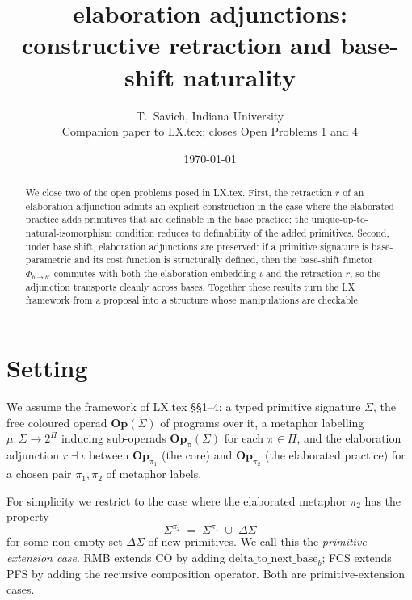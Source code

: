 \documentclass[11pt]{article}
\title{elaboration adjunctions: constructive retraction and base-shift naturality}
\author{T.\ Savich, Indiana University\\
\small Companion paper to LX.tex; closes Open Problems 1 and 4}
\date{\today}
\begin{document}
\maketitle

\noindent{}
\bigskip

\begin{abstract}
We close two of the open problems posed in LX.tex. First, the
retraction $r$ of an elaboration adjunction admits an explicit construction
in the case where the elaborated practice adds primitives that are
definable in the base practice; the unique-up-to-natural-isomorphism
condition reduces to definability of the added primitives. Second,
under base shift, elaboration adjunctions are preserved: if a primitive
signature is base-parametric and its cost function is structurally
defined, then the base-shift functor $\Phi_{b \to b'}$ commutes with
both the elaboration embedding $\iota$ and the retraction $r$, so the
adjunction transports cleanly across bases. Together these results
turn the LX framework from a proposal into a structure whose
manipulations are checkable.
\end{abstract}

\section{Setting}

We assume the framework of LX.tex \S\S 1--4: a typed primitive
signature $\Sigma$, the free coloured operad $\mathbf{Op}(\Sigma)$ of
programs over it, a metaphor labelling $\mu : \Sigma \to 2^\Pi$
inducing sub-operads $\mathbf{Op}_\pi(\Sigma)$ for each
$\pi \in \Pi$, and the elaboration adjunction $r \dashv \iota$ between
$\mathbf{Op}_{\pi_1}$ (the core) and $\mathbf{Op}_{\pi_2}$ (the
elaborated practice) for a chosen pair $\pi_1, \pi_2$ of metaphor
labels.

For simplicity we restrict to the case where the elaborated metaphor
$\pi_2$ has the property
\[
\Sigma^{\pi_2} \;=\; \Sigma^{\pi_1} \;\cup\; \Delta\Sigma
\]
for some non-empty set $\Delta\Sigma$ of new primitives. We call
this the \emph{primitive-extension case}. RMB extends CO by adding
$\mathrm{delta\_to\_next\_base}_b$; FCS extends PFS by adding the
recursive composition operator. Both are primitive-extension cases.
\end{document}

